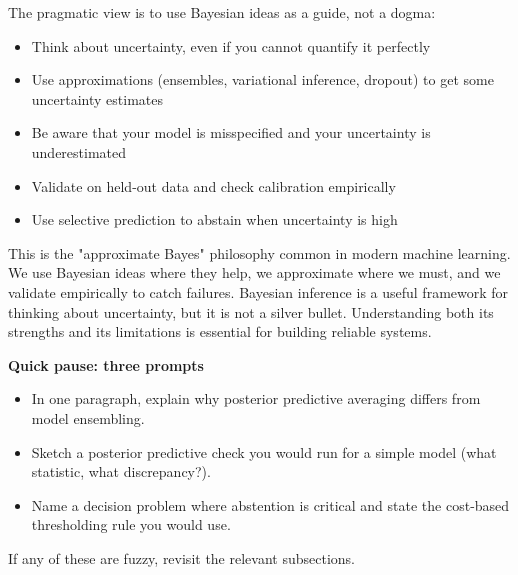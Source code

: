 The pragmatic view is to use Bayesian ideas as a guide, not a dogma:

\begin{itemize}
\item Think about uncertainty, even if you cannot quantify it perfectly
\item Use approximations (ensembles, variational inference, dropout) to get some uncertainty estimates
\item Be aware that your model is misspecified and your uncertainty is underestimated
\item Validate on held-out data and check calibration empirically
\item Use selective prediction to abstain when uncertainty is high
\end{itemize}

This is the "approximate Bayes" philosophy common in modern machine learning. We use Bayesian ideas where they help, we approximate where we must, and we validate empirically to catch failures. Bayesian inference is a useful framework for thinking about uncertainty, but it is not a silver bullet. Understanding both its strengths and its limitations is essential for building reliable systems.

\vspace{2em}




\vspace{2em}


\begin{pausebox}
\textbf{Quick pause: three prompts}

\begin{itemize}
\item In one paragraph, explain why posterior predictive averaging differs from model ensembling.
\item Sketch a posterior predictive check you would run for a simple model (what statistic, what discrepancy?).
\item Name a decision problem where abstention is critical and state the cost-based thresholding rule you would use.
\end{itemize}

If any of these are fuzzy, revisit the relevant subsections.
\end{pausebox}

\vspace{1em}

